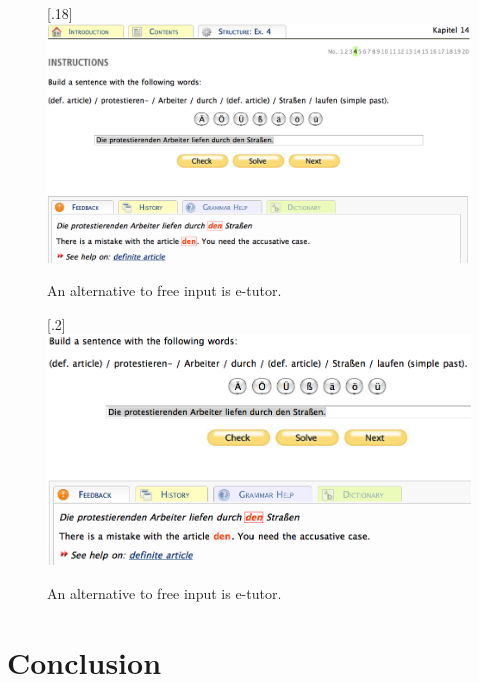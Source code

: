 \documentclass[11pt]{article}
\begin{document}
\begin{figure}[htbp]
\begin{center}
\scalebox{.18}[.18]{\includegraphics{presentation/img/e-tutor.png}}\\
\caption{An alternative to free input is e-tutor.}
\label{etutor}
\end{center}
\end{figure}

\begin{figure}[htbp]
\begin{center}
\scalebox{.2}[.2]{\includegraphics{presentation/img/e-tutor-small.png}}\\
\caption{An alternative to free input is e-tutor.}
\label{etutor}
\end{center}
\end{figure}

\section{Conclusion}
\end{document}
